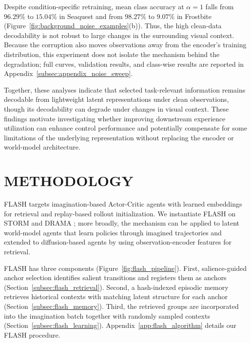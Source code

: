 \documentclass{article} %
\begin{document}
Despite condition-specific retraining, mean class accuracy at $\alpha=1$ falls from $96.29\%$ to $15.04\%$ in Seaquest and from $98.27\%$ to $9.07\%$ in Frostbite (Figure~\ref{fig:background_noise_examples}(b)). Thus, the high clean-data decodability is not robust to large changes in the surrounding visual context. Because the corruption also moves observations away from the encoder's training distribution, this experiment does not isolate the mechanism behind the degradation; full curves, validation results, and class-wise results are reported in Appendix~\ref{subsec:appendix_noise_sweep}. 

Together, these analyses indicate that selected task-relevant information remains decodable from lightweight latent representations under clean observations, though its decodability can degrade under changes in visual context. These findings motivate investigating whether improving downstream experience utilization can enhance control performance and potentially compensate for some limitations of the underlying representation without replacing the encoder or world-model architecture.


\section{METHODOLOGY}
\label{sec:method}

FLASH targets imagination-based Actor-Critic agents with learned embeddings for retrieval and replay-based rollout initialization. We instantiate FLASH on STORM \citep{zhang2023storm} and DRAMA \citep{wang2025drama}; more broadly, the mechanism can be applied to latent world-model agents that learn policies through imagined trajectories \citep{hafner2023mastering} and extended to diffusion-based agents \citep{lee2026edeline} by using observation-encoder features for retrieval.

FLASH has three components (Figure~\ref{fig:flash_pipeline}). First, salience-guided anchor selection identifies salient transitions and registers them as anchors (Section~\ref{subsec:flash_retrieval}). Second, a hash-indexed episodic memory retrieves historical contexts with matching latent structure for each anchor (Section~\ref{subsec:flash_memory}). Third, the retrieved groups are incorporated into the imagination batch together with randomly sampled contexts (Section~\ref{subsec:flash_learning}). Appendix~\ref{app:flash_algorithm} details our FLASH procedure.
\end{document}
